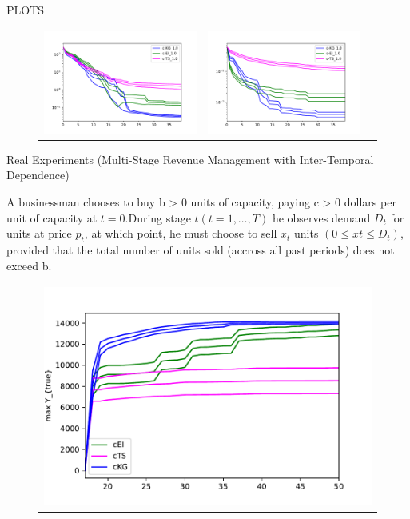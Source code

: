 \documentclass{beamer}
\begin{document}
\begin{frame}{PLOTS}
\begin{figure}
\begin{tabular}{ccc}
		\includegraphics[width=0.32\linewidth]{new_brannin_OC_1_0.pdf}&
		\includegraphics[width=0.32\linewidth]{test_function_OC_1_0.pdf}\\
	\end{tabular}	
\end{figure}
\end{frame}


\begin{frame}{Real Experiments (Multi-Stage Revenue Management with Inter-Temporal Dependence)}

A businessman chooses to buy b > 0 units of capacity, paying c > 0 dollars per unit of capacity at $t = 0$.During stage $t (t = 1, \dots , T)$ he observes demand $D_{t}$ for units at price $p_{t}$, at which point, he must choose to sell $x_{t}$ units $(0 \leq xt \leq D_{t})$, provided that the total number of units sold (accross all past periods) does not exceed b.

\begin{figure}
	
	\centering
	\begin{tabular}{c}
		\includegraphics[width=0.7\linewidth]{RMITD_OC.pdf}\\
	\end{tabular}	
\end{figure}
\end{frame}
\end{document}
